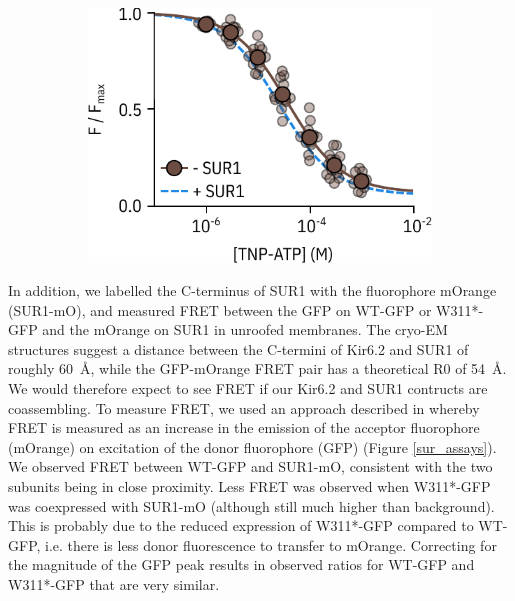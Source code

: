 \begin{figure}[h]
\begin{subfigure}[t]{0.45\textwidth}
		\includegraphics[width=\textwidth]{nosur_unroofed.pdf}
	\end{subfigure}
	\caption[SUR1 alters inhibition but not binding at Kir6.2]{
	}\label{ch6fig:no_sur}
\end{figure}

In addition, we labelled the C-terminus of SUR1 with the fluorophore mOrange (SUR1-mO), and measured FRET between the GFP on WT-GFP or W311*-GFP and the mOrange on SUR1 in unroofed membranes.
The cryo-EM structures suggest a distance between the C-termini of Kir6.2 and SUR1 of roughly \SI{60}{\angstrom}, while the GFP-mOrange FRET pair has a theoretical R0 of \SI{54}{\angstrom}.
We would therefore expect to see FRET if our Kir6.2 and SUR1 contructs are coassembling.
To measure FRET, we used an approach described in \cite{zheng_rod_2002} whereby FRET is measured as an increase in the emission of the acceptor fluorophore (mOrange) on excitation of the donor fluorophore (GFP) (Figure \ref{sur_assays}).
We observed FRET between WT-GFP and SUR1-mO, consistent with the two subunits being in close proximity.
Less FRET was observed when W311*-GFP was coexpressed with SUR1-mO (although still much higher than background).
This is probably due to the reduced expression of W311*-GFP compared to WT-GFP, i.e. there is less donor fluorescence to transfer to mOrange.
Correcting for the magnitude of the GFP peak results in observed ratios for WT-GFP and W311*-GFP that are very similar.

